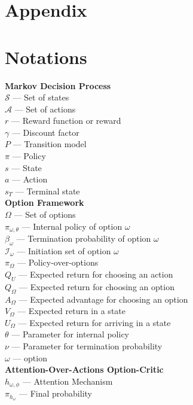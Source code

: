 \documentclass{article}
\begin{document}
	\section*{Appendix}
	\appendix
	\section{Notations}
	{\bfseries Markov Decision Process}\\
	$\mathcal{S}$ --- Set of states\\
	$\mathcal{A}$ --- Set of actions\\
	$r$ --- Reward function or reward\\
	$\gamma$ --- Discount factor\\
	$P$ --- Transition model\\
	$\pi$ --- Policy\\
	$s$ --- State\\
	$a$ --- Action\\
	$s_T$ --- Terminal state\vspace{0.1in}\\
	{\bfseries Option Framework}\\
	$\Omega$ --- Set of options\\
	$\pi_{\omega,\theta}$ --- Internal policy of option $\omega$\\
	$\beta_\omega$ --- Termination probability of option $\omega$\\
	$\mathcal{I}_\omega$ --- Initiation set of option $\omega$\\
	$\pi_\Omega$ --- Policy-over-options\\
	$Q_U$ --- Expected return for choosing an action\\
	$Q_\Omega$ --- Expected return for choosing an option\\
	$A_\Omega$ --- Expected advantage for choosing an option\\
	$V_\Omega$ --- Expected return in a state\\
	$U_\Omega$ --- Expected return for arriving in a state\\
	$\theta$ --- Parameter for internal policy\\
	$\nu$ --- Parameter for termination probability\\
	$\omega$ --- option\vspace{0.1in}\\
	{\bfseries Attention-Over-Actions Option-Critic}\\
	$h_{\omega,\phi}$ --- Attention Mechanism\\
	$\pi_{h_\omega}$ --- Final probability\\
\end{document}
